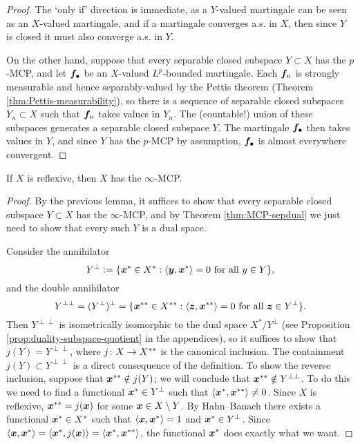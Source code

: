 \begin{proof}
  The `only if' direction is immediate, as a $Y$-valued martingale can be seen as an $X$-valued martingale, and if a martingale converges a.s. in $X$, then since $Y$ is closed it must also converge a.s. in $Y$.

  On the other hand, suppose that every separable closed subspace $Y \subset X$ has the $p$-MCP, and let $\bm{f}_{\bullet}$ be an $X$-valued $L^p$-bounded martingale.
  Each $\bm{f}_n$ is strongly measurable and hence separably-valued by the Pettis theorem (Theorem \ref{thm:Pettis-measurability}), so there is a sequence of separable closed subspaces $Y_n \subset X$ such that $\bm{f}_n$ takes values in $Y_n$.
  The (countable!) union of these subspaces generates a separable closed subspace $Y$.
  The martingale $\bm{f}_{\bullet}$ then takes values in $Y$, and since $Y$ has the $p$-MCP by assumption, $\bm{f}_{\bullet}$ is almost everywhere convergent.
\end{proof}

\begin{cor}\label{cor:MCP-reflexive}
  If $X$ is reflexive, then $X$ has the $\infty$-MCP.
\end{cor}

\begin{proof}
  By the previous lemma, it suffices to show that every separable closed subspace $Y \subset X$ has the $\infty$-MCP, and by Theorem \ref{thm:MCP-sepdual} we just need to show that every such $Y$ is a dual space.
  
  Consider the annihilator
  \begin{equation*}
    Y^{\perp} := \{\bm{x}^* \in X^* :  \text{$\langle \bm{y}, \bm{x}^* \rangle = 0$ for all $y \in Y$}\},
  \end{equation*}
  and the double annihilator
  \begin{equation*}
    Y^{\perp\perp} = (Y^\perp)^\perp = \{\bm{x}^{**} \in X^{**} : \text{$\langle \bm{z}, \bm{x}^{**} \rangle = 0$ for all $\bm{z} \in Y^\perp$}\}.
  \end{equation*}
  Then $Y^{\perp\perp}$ is isometrically isomorphic to the dual space $X^*/Y^\perp$ (see Proposition \ref{prop:duality-subspace-quotient} in the appendices), so it suffices to show that $j(Y) = Y^{\perp\perp}$, where $j \colon X \rightarrow X^{**}$ is the canonical inclusion.
  The containment $j(Y) \subset Y^{\perp\perp}$ is a direct consequence of the definition.
  To show the reverse inclusion, suppose that $\bm{x}^{**} \notin j(Y)$; we will conclude that $\bm{x}^{**} \notin Y^{\perp\perp}$.
  To do this we need to find a functional $\bm{x}^* \in Y^{\perp}$ such that $\langle\bm{x}^*, \bm{x}^{**}\rangle \neq 0$.
  Since $X$ is reflexive, $\bm{x}^{**} = j(\bm{x})$ for some $\bm{x} \in X \setminus Y$.
  By Hahn--Banach there exists a functional $\bm{x}^* \in X^*$ such that $\langle \bm{x}, \bm{x}^* \rangle = 1$ and $\bm{x}^* \in Y^\perp$.
  Since $\langle \bm{x}, \bm{x}^* \rangle = \langle \bm{x}^*, j(\bm{x}) \rangle = \langle \bm{x}^*, \bm{x}^{**} \rangle$, the functional $\bm{x}^*$ does exactly what we want.
\end{proof}

